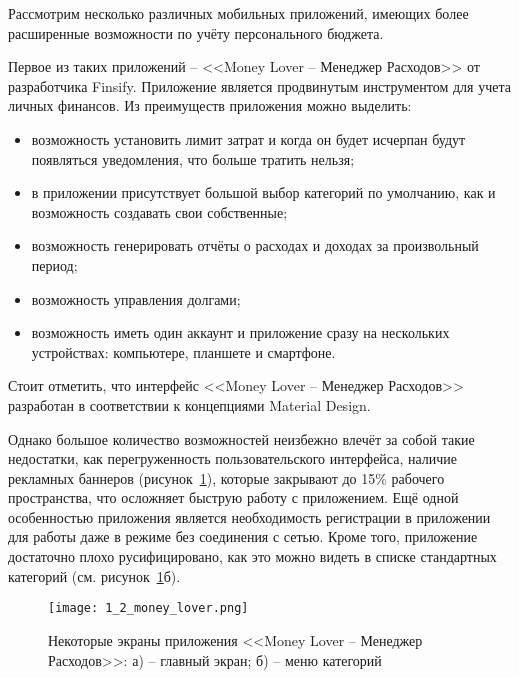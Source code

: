 Рассмотрим несколько различных мобильных приложений, имеющих более расширенные возможности по учёту персонального бюджета.

Первое из таких приложений -- <<Money Lover -- Менеджер Расходов>> от разработчика Finsify.
Приложение является продвинутым инструментом для учета личных финансов.
Из преимуществ приложения можно выделить:
\begin{itemize}
    \item возможность установить лимит затрат и когда он будет исчерпан будут появляться уведомления, что больше тратить нельзя;
    \item в приложении присутствует большой выбор категорий по умолчанию, как и возможность создавать свои собственные;
    \item возможность генерировать отчёты о расходах и доходах за произвольный период;
    \item возможность управления долгами;
    \item возможность иметь один аккаунт и приложение сразу на нескольких устройствах: компьютере, планшете и смартфоне.
\end{itemize}

Стоит отметить, что интерфейс <<Money Lover -- Менеджер Расходов>> разработан в соответствии к концепциями Material Design.

Однако большое количество возможностей неизбежно влечёт за собой такие недостатки, как перегруженность пользовательского интерфейса, наличие рекламных баннеров (рисунок~\ref{fig:analysis:analogues:money_lover}), которые закрывают до 15\% рабочего пространства, что осложняет быструю работу с приложением.
Ещё одной особенностью приложения является необходимость регистрации в приложении для работы даже в режиме без соединения с сетью.
Кроме того, приложение достаточно плохо русифицировано, как это можно видеть в списке стандартных категорий (см. рисунок~\ref{fig:analysis:analogues:money_lover}б).

\begin{figure}
    \centering
    \texttt{[image: 1\_2\_money\_lover.png]}
    \caption{Некоторые экраны приложения <<Money Lover -- Менеджер Расходов>>: а) -- главный экран; б) -- меню категорий}
    \label{fig:analysis:analogues:money_lover}
\end{figure}

